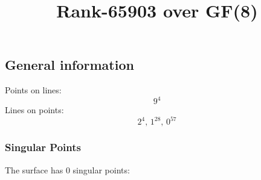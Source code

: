\documentclass{article}
\newcommand\setTBstruts{\def\T{\rule{0pt}{2.6ex}}%
\def\B{\rule[-1.2ex]{0pt}{0pt}}}
\begin{document}
 
\setTBstruts



{\allowdisplaybreaks%






\title{Rank-65903 over GF(8)}
\author{}%
\maketitle%
%
{}



\subsection*{General information}
Points on lines:
$$
9^4$$
Lines on points:
$$
2^4,\,1^{28},\,0^{57}$$
\subsubsection*{Singular Points}
The surface has 0 singular points:\\
\begin{align*}
\end{align*}
}
\end{document}
